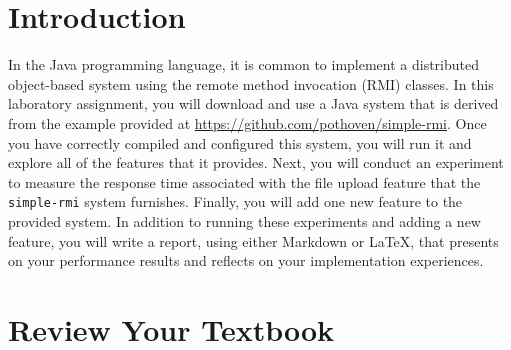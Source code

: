 

\usepackage[compact]{titlesec}



\section*{Introduction}


In the Java programming language, it is common to implement a distributed object-based system using the remote method
invocation (RMI) classes. In this laboratory assignment, you will download and use a Java system that is derived from
the example provided at \url{https://github.com/pothoven/simple-rmi}. Once you have correctly compiled and configured
this system, you will run it and explore all of the features that it provides. Next, you will conduct an experiment to
measure the response time associated with the file upload feature that the {\tt simple-rmi} system furnishes. Finally,
you will add one new feature to the provided system. In addition to running these experiments and adding a new feature,
you will write a report, using either Markdown or \LaTeX, that presents on your performance results and reflects on your
implementation experiences.

\section*{Review Your Textbook}

